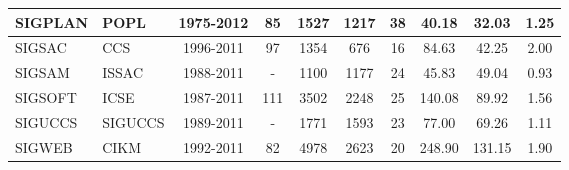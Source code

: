 \begin{table*}[!htb]
{\begin{tabular}{|l|l|c|c|c|c|c|c|c|c|}
SIGPLAN & POPL & 1975-2012 & 85 & 1527 & 1217 & 38 & 40.18 & 32.03 & 1.25\\ \hline
SIGSAC & CCS & 1996-2011 & 97 & 1354 & 676 & 16 & 84.63 & 42.25 & 2.00\\ \hline
SIGSAM & ISSAC & 1988-2011 & - & 1100 & 1177 & 24 & 45.83 & 49.04 & 0.93\\ \hline
SIGSOFT & ICSE & 1987-2011 & 111 & 3502 & 2248 & 25 & 140.08 & 89.92 & 1.56\\ \hline
SIGUCCS & SIGUCCS & 1989-2011 & - & 1771 & 1593 & 23 & 77.00 & 69.26 & 1.11\\ \hline
SIGWEB & CIKM & 1992-2011 & 82 & 4978 & 2623 & 20 & 248.90 & 131.15 & 1.90\\ \hline
\end{tabular}
}
\end{table*}











